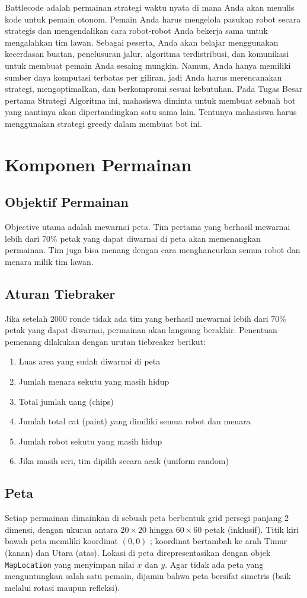 Battlecode adalah permainan strategi waktu nyata di mana Anda akan menulis kode untuk pemain otonom. Pemain Anda harus mengelola pasukan robot secara strategis dan mengendalikan cara robot-robot Anda bekerja sama untuk mengalahkan tim lawan. Sebagai peserta, Anda akan belajar menggunakan kecerdasan buatan, penelusuran jalur, algoritma terdistribusi, dan komunikasi untuk membuat pemain Anda sesaing mungkin. Namun, Anda hanya memiliki sumber daya komputasi terbatas per giliran, jadi Anda harus merencanakan strategi, mengoptimalkan, dan berkompromi sesuai kebutuhan.
Pada Tugas Besar pertama  Strategi Algoritma ini, mahasiswa diminta untuk membuat sebuah bot yang nantinya akan dipertandingkan satu sama lain. Tentunya mahasiswa harus menggunakan strategi greedy dalam membuat bot ini.

\section{Komponen Permainan}
\subsection{Objektif Permainan}
Objective utama adalah mewarnai peta. Tim pertama yang berhasil mewarnai lebih dari 70\% petak yang dapat diwarnai di peta akan memenangkan permainan. Tim juga bisa menang dengan cara menghancurkan semua robot dan menara milik tim lawan.

\subsection{Aturan Tiebraker}
Jika setelah 2000 ronde tidak ada tim yang berhasil mewarnai lebih dari 70\% petak yang dapat diwarnai, permainan akan langsung berakhir. Penentuan pemenang dilakukan dengan urutan tiebreaker berikut:
\begin{enumerate}
    \item Luas area yang sudah diwarnai di peta
    \item Jumlah menara sekutu yang masih hidup
    \item Total jumlah uang (chips)
    \item Jumlah total cat (paint) yang dimiliki semua robot dan menara
    \item Jumlah robot sekutu yang masih hidup
    \item Jika masih seri, tim dipilih secara acak (uniform random)
\end{enumerate}

\subsection{Peta}
Setiap permainan dimainkan di sebuah peta berbentuk grid persegi panjang 2 dimensi, dengan ukuran antara $20 \times 20$ hingga $60 \times 60$ petak (inklusif). Titik kiri bawah peta memiliki koordinat $(0, 0)$ ; koordinat bertambah ke arah Timur (kanan) dan Utara (atas). Lokasi di peta direpresentasikan dengan objek \texttt{MapLocation} yang menyimpan nilai $x$ dan $y$. Agar tidak ada peta yang menguntungkan salah satu pemain, dijamin bahwa peta bersifat simetris (baik melalui rotasi maupun refleksi).

